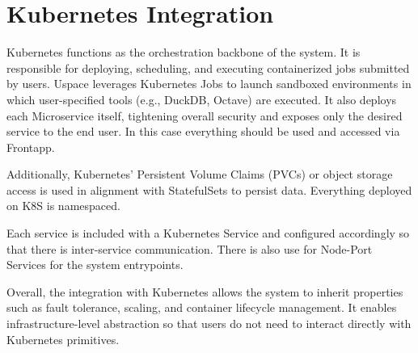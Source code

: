\section{Kubernetes Integration}

Kubernetes functions as the orchestration backbone of the system. It is responsible for deploying, scheduling, and executing containerized jobs 
submitted by users. Uspace leverages Kubernetes Jobs to launch sandboxed environments in which user-specified tools (e.g., DuckDB, Octave) are 
executed. It also deploys each Microservice itself, tightening overall security and exposes only the desired service to the end user. In 
this case everything should be used and accessed via Frontapp.

Additionally, Kubernetes' Persistent Volume Claims (PVCs) or object storage access is used in alignment with StatefulSets to persist data. 
Everything deployed on K8S is namespaced. 

Each service is included with a Kubernetes Service and configured accordingly so that there is inter-service communication. There is also use 
for Node-Port Services for the system entrypoints.

Overall, the integration with Kubernetes allows the system to inherit properties such as fault tolerance, scaling, and container lifecycle management. 
It enables infrastructure-level abstraction so that users do not need to interact directly with Kubernetes primitives.
